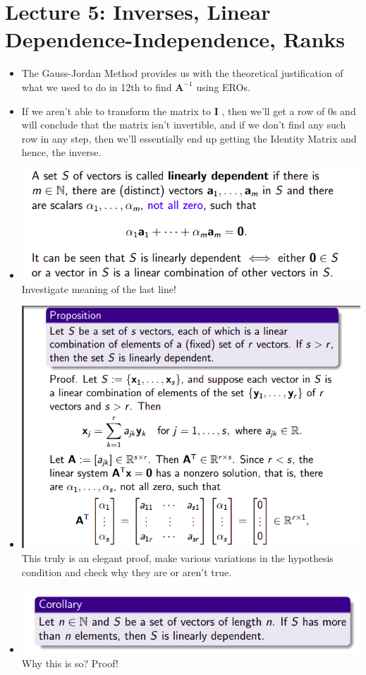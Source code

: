 \documentclass{article}
\begin{document}
\section{Lecture 5: Inverses, Linear Dependence-Independence, Ranks}
\begin{itemize}
  \item The Gauss-Jordan Method provides us with the theoretical justification of what we used to do in 12th to find $\mathbf{A}^{-1}$ using EROs.
  \item If we aren't able to transform the matrix to $\mathbf{I}$ , then we'll get a row of 0s and will conclude that the matrix isn't invertible, and if we don't find any such row in any step, then we'll essentially end up getting the Identity Matrix and hence, the inverse.
  \item \includegraphics[scale = 0.5]{2.png} \\ Investigate meaning of the last line!
  \item \includegraphics[scale = 0.5]{3.png} \\ This truly is an elegant proof, make various variations in the hypothesis condition and check why they are or aren't true.
  \item \includegraphics[scale = 0.5]{4.png} \\ Why this is so? Proof!

\end{itemize}
\end{document}
